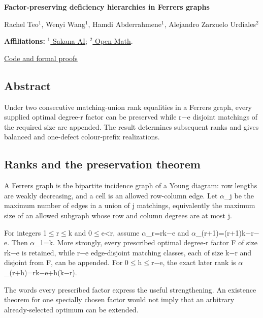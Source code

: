 \documentclass[11pt,a4paper]{article}
\begin{document}
{\LARGE\bfseries Factor-preserving deficiency hierarchies in Ferrers graphs\par}\medskip
{\small Rachel Teo\ensuremath{^1}, Wenyi Wang\ensuremath{^1}, Hamdi Abderrahmene\ensuremath{^1}, Alejandro Zarzuelo Urdiales\ensuremath{^2}\par}\medskip
{\small\textbf{Affiliations:} \href{https://sakana.ai/}{\ensuremath{^1} Sakana AI}; \href{https://rsihouse.ai/openmath}{\ensuremath{^2} Open Math}.\par}

{\small\href{https://github.com/alejandrozu/openmath-2026-judging}{Code and formal proofs}\par}

\subsection{Abstract}
Under two consecutive matching-union rank equalities in a Ferrers graph, every supplied optimal degree-r factor can be preserved while r\ensuremath{-}e disjoint matchings of the required size are appended. The result determines subsequent ranks and gives balanced and one-defect colour-prefix realizations.

\subsection{Ranks and the preservation theorem}
A Ferrers graph is the bipartite incidence graph of a Young diagram: row lengths are weakly decreasing, and a cell is an allowed row-column edge. Let \ensuremath{\alpha}\_j be the maximum number of edges in a union of j matchings, equivalently the maximum size of an allowed subgraph whose row and column degrees are at most j.

For integers 1\ensuremath{\leq}r\ensuremath{\leq}k and 0\ensuremath{\leq}e<r, assume \ensuremath{\alpha}\_r=rk\ensuremath{-}e and \ensuremath{\alpha}\_(r+1)=(r+1)k\ensuremath{-}r\ensuremath{-}e. Then \ensuremath{\alpha}\_1=k. More strongly, every prescribed optimal degree-r factor F of size rk\ensuremath{-}e is retained, while r\ensuremath{-}e edge-disjoint matching classes, each of size k\ensuremath{-}r and disjoint from F, can be appended. For 0\ensuremath{\leq}h\ensuremath{\leq}r\ensuremath{-}e, the exact later rank is \ensuremath{\alpha}\_(r+h)=rk\ensuremath{-}e+h(k\ensuremath{-}r).

The words every prescribed factor express the useful strengthening. An existence theorem for one specially chosen factor would not imply that an arbitrary already-selected optimum can be extended.
\end{document}

